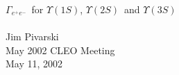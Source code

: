 

\def\ys{$\Upsilon(1S)$}
\def\yss{$\Upsilon(2S)$}
\def\ysss{$\Upsilon(3S)$}
\def\gamee{$\Gamma_{e^+e^-}$}

\newcommand{\talktitle}[0]{\gamee for \ys, \yss\  and \ysss}
\newcommand{\fmttitle}[0]{}
\newcommand{\conftitle}[0]{May 2002 CLEO Meeting}
\newcommand{\myname}[0]{Jim Pivarski}
\newcommand{\affila}[0]{Cornell University}
\newcommand{\talkdate}[0]{May 11, 2002}

\pagestyle{conference}   %




\slideheight 7.0in
\slidewidth 8.8in 

\renewcommand{\arraystretch}{0.3}
\renewcommand{\slidetopmargin}{0.4in}
\renewcommand{\slidebottommargin}{0.9in}



\begin{slide*}

\slideframe{}

\begin{center}
\vspace{4 cm}
{\Huge \black \gamee\ for \ys, \yss\ and \ysss } \\
 \\
\vspace{1 cm}
{\LARGE \black	Jim Pivarski } \\
\vspace{2 cm}
\conftitle \\
{\large \black \talkdate}

\end{center}

\end{slide*}


